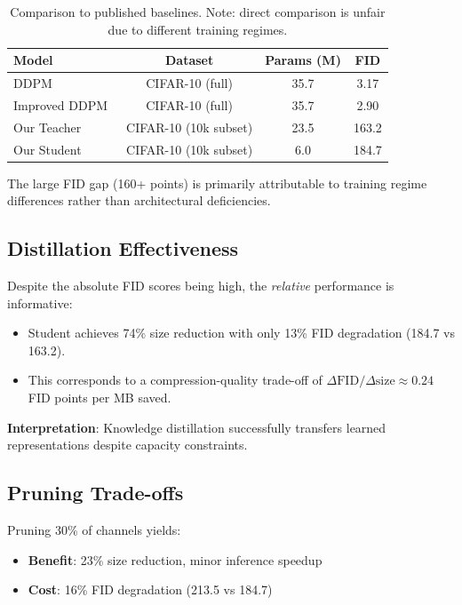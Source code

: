 \documentclass[12pt]{report}
\theoremstyle{definition}
\begin{document}
\begin{table}[H]
\centering
\begin{tabular}{lccc}
\toprule
\textbf{Model} & \textbf{Dataset} & \textbf{Params (M)} & \textbf{FID} \\
\midrule
DDPM~\citep{ho2020denoising} & CIFAR-10 (full) & 35.7 & 3.17 \\
Improved DDPM~\citep{nichol2021improved} & CIFAR-10 (full) & 35.7 & 2.90 \\
Our Teacher & CIFAR-10 (10k subset) & 23.5 & 163.2 \\
Our Student & CIFAR-10 (10k subset) & 6.0 & 184.7 \\
\bottomrule
\end{tabular}
\caption{Comparison to published baselines. Note: direct comparison is unfair due to different training regimes.}
\label{tab:baselines}
\end{table}

The large FID gap (160+ points) is primarily attributable to training regime differences rather than architectural deficiencies.

\subsection{Distillation Effectiveness}

Despite the absolute FID scores being high, the \textit{relative} performance is informative:

\begin{itemize}
\item Student achieves 74\% size reduction with only 13\% FID degradation (184.7 vs 163.2).
\item This corresponds to a compression-quality trade-off of $\Delta\text{FID} / \Delta\text{size} \approx 0.24$ FID points per MB saved.
\end{itemize}

\textbf{Interpretation}: Knowledge distillation successfully transfers learned representations despite capacity constraints.

\subsection{Pruning Trade-offs}

Pruning 30\% of channels yields:
\begin{itemize}
\item \textbf{Benefit}: 23\% size reduction, minor inference speedup
\item \textbf{Cost}: 16\% FID degradation (213.5 vs 184.7)
\end{itemize}
\end{document}
